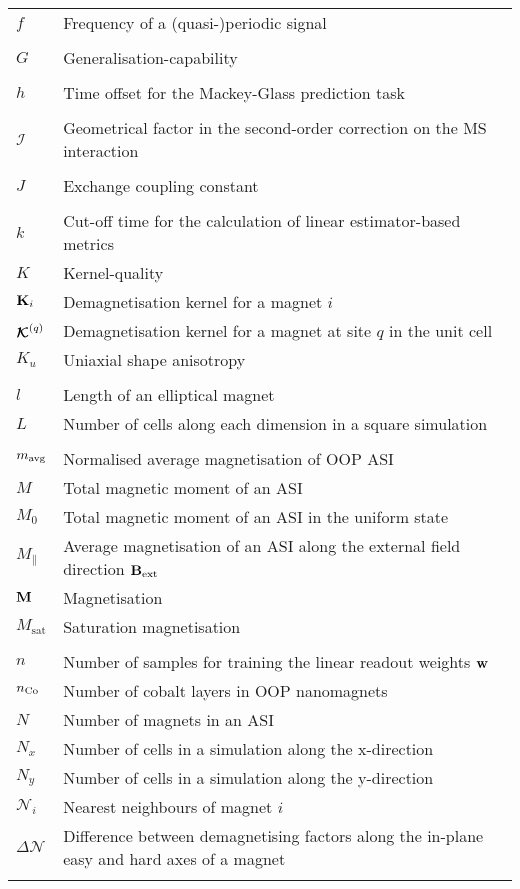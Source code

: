 \begin{longtable}[l]{p{60pt} p{350pt}}
	$f$ & Frequency of a (quasi-)periodic signal \\
	&\\

	$G$ & Generalisation-capability \\
	& \\

	$h$ & Time offset for the Mackey-Glass prediction task \\
	&\\

	$\mathcal{I}$ & Geometrical factor in the second-order correction on the MS interaction \\
	&\\

	$J$ & Exchange coupling constant \\
	&\\

	$k$ & Cut-off time for the calculation of linear estimator-based metrics \\
	$K$ & Kernel-quality \\ %
	$\boldsymbol{\mathbf{K}}_i$ & Demagnetisation kernel for a magnet $i$ \\
	$\boldsymbol{\mathbf{\mathcal{K}}}^{(q)}$ & Demagnetisation kernel for a magnet at site $q$ in the unit cell \\
	$K_u$ & Uniaxial shape anisotropy \\
	&\\

	$l$ & Length of an elliptical magnet \\
	$L$ & Number of cells along each dimension in a square simulation \\
	&\\

	$m_\mathrm{avg}$ & Normalised average magnetisation of OOP ASI \\
	$M$ & Total magnetic moment of an ASI \\
	$M_0$ & Total magnetic moment of an ASI in the uniform state \\
	$M_\parallel$ & Average magnetisation of an ASI along the external field direction $\boldsymbol{\mathbf{B}}_\mathrm{ext}$ \\
	$\boldsymbol{\mathbf{M}}$ & Magnetisation \\
	$M_\mathrm{sat}$ & Saturation magnetisation \\
	&\\

	$n$ & Number of samples for training the linear readout weights $\boldsymbol{\mathbf{w}}$ \\
	$n_{\ce{Co}}$ & Number of cobalt layers in OOP nanomagnets \\
	$N$ & Number of magnets in an ASI \\
	$N_x$ & Number of cells in a simulation along the x-direction \\
	$N_y$ & Number of cells in a simulation along the y-direction \\
	$\mathcal{N}_i$ & Nearest neighbours of magnet $i$ \\
	$\Delta \mathcal{N}$ & Difference between demagnetising factors along the in-plane easy and hard axes of a magnet \\
	&\\


\end{longtable}
